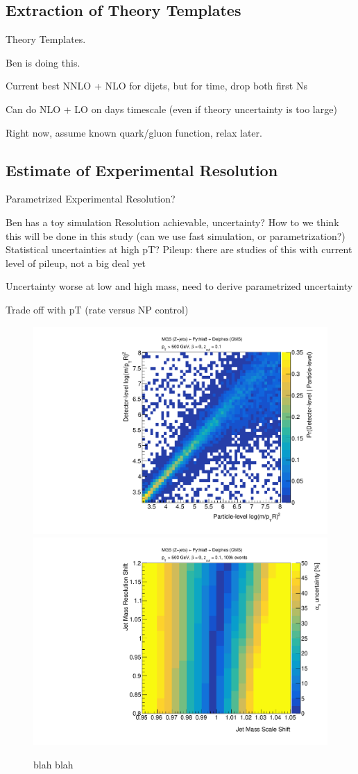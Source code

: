 
\subsection{Extraction of Theory Templates}

	Theory Templates.

	Ben is doing this.

	Current best NNLO + NLO for dijets, but for time, drop both first Ns
 
 Can do NLO + LO on days timescale (even if theory uncertainty is too large)

 Right now, assume known quark/gluon function, relax later.


\subsection{Estimate of Experimental Resolution}

	Parametrized Experimental Resolution?

	Ben has a toy simulation
	Resolution achievable, uncertainty?
	How to we think this will be done in this study (can we use fast simulation, or parametrization?)
	Statistical uncertainties at high pT?
	Pileup:  there are studies of this with current level of pileup, not a big deal yet

	Uncertainty worse at low and high mass, need to derive parametrized uncertainty
	
	Trade off with pT (rate versus NP control)

\begin{figure}
\begin{center}
\includegraphics[width = 0.49\columnwidth]{figures/experimentaldemo/SD_resolution.pdf}\includegraphics[width = 0.49\columnwidth]{figures/experimentaldemo/resolution_scan.pdf}
\end{center}
\caption{blah blah}
\label{fig:expfit}
\end{figure}

